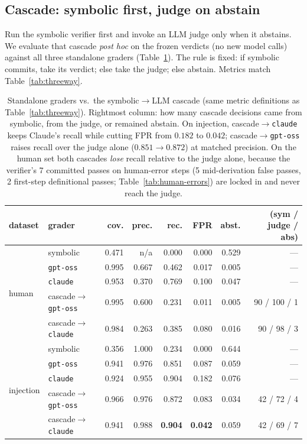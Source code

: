 \subsection{Cascade: symbolic first, judge on abstain}
\label{sec:cascade}

Run the symbolic verifier first and invoke an LLM judge only when it abstains.
We evaluate that cascade
\emph{post hoc} on the frozen verdicts (no new model calls) against all three
standalone graders (Table~\ref{tab:cascade}). The rule is fixed: if symbolic
commits, take its verdict; else take the judge; else abstain. Metrics match
Table~\ref{tab:threeway}.

\begin{table}[t]
\centering
\footnotesize
\setlength{\tabcolsep}{2.5pt}
\begin{tabular}{llrrrrrr}
\toprule
dataset & grader & cov. & prec. & rec. & FPR & abst. & (sym / judge / abs) \\
\midrule
\multirow{5}{*}{human}
 & symbolic & 0.471 & n/a & 0.000 & 0.000 & 0.529 & --- \\
 & \texttt{gpt-oss} & 0.995 & 0.667 & 0.462 & 0.017 & 0.005 & --- \\
 & \texttt{claude} & 0.953 & 0.370 & 0.769 & 0.100 & 0.047 & --- \\
 & cascade$\rightarrow$\texttt{gpt-oss} & 0.995 & 0.600 & 0.231 & 0.011 & 0.005 & 90 / 100 / 1 \\
 & cascade$\rightarrow$\texttt{claude} & 0.984 & 0.263 & 0.385 & 0.080 & 0.016 & 90 / 98 / 3 \\
\midrule
\multirow{5}{*}{injection}
 & symbolic & 0.356 & 1.000 & 0.234 & 0.000 & 0.644 & --- \\
 & \texttt{gpt-oss} & 0.941 & 0.976 & 0.851 & 0.087 & 0.059 & --- \\
 & \texttt{claude} & 0.924 & 0.955 & 0.904 & 0.182 & 0.076 & --- \\
 & cascade$\rightarrow$\texttt{gpt-oss} & 0.966 & 0.976 & 0.872 & 0.083 & 0.034 & 42 / 72 / 4 \\
 & cascade$\rightarrow$\texttt{claude} & 0.941 & 0.988 & \textbf{0.904} & \textbf{0.042} & 0.059 & 42 / 69 / 7 \\
\bottomrule
\end{tabular}
\caption{Standalone graders vs.\ the symbolic$\rightarrow$LLM cascade (same
metric definitions as Table~\ref{tab:threeway}). Rightmost column: how many
cascade decisions came from symbolic, from the judge, or remained abstain.
On injection, cascade$\rightarrow$\texttt{claude} keeps Claude's recall while
cutting FPR from $0.182$ to $0.042$; cascade$\rightarrow$\texttt{gpt-oss} raises
recall over the judge alone ($0.851\rightarrow 0.872$) at matched precision. On
the human set both cascades \emph{lose} recall relative to the judge alone,
because the verifier's 7 committed passes on human-error steps (5
mid-derivation false passes, 2 first-step definitional passes;
Table~\ref{tab:human-errors}) are locked in and never reach the judge.}
\label{tab:cascade}
\end{table}

